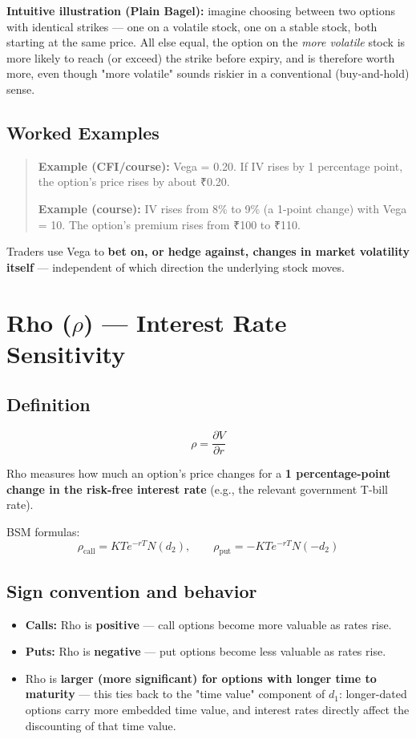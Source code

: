 \documentclass[12pt,openany]{book}
\theoremstyle{definition}
\theoremstyle{remark}
\begin{document}
\textbf{Intuitive illustration (Plain Bagel):} imagine choosing between two options with identical strikes — one on a volatile stock, one on a stable stock, both starting at the same price. All else equal, the option on the \emph{more volatile} stock is more likely to reach (or exceed) the strike before expiry, and is therefore worth more, even though "more volatile" sounds riskier in a conventional (buy-and-hold) sense.

\subsection{Worked Examples}

\begin{quote}
\textbf{Example (CFI/course):} Vega = 0.20. If IV rises by 1 percentage point, the option's price rises by about ₹0.20.

\textbf{Example (course):} IV rises from 8\% to 9\% (a 1-point change) with Vega = 10. The option's premium rises from ₹100 to ₹110.
\end{quote}

Traders use Vega to \textbf{bet on, or hedge against, changes in market volatility itself} — independent of which direction the underlying stock moves.


\section{Rho (\texorpdfstring{\(\rho\)}{rho}) — Interest Rate Sensitivity}

\subsection{Definition}

\[
\rho = \frac{\partial V}{\partial r}
\]

Rho measures how much an option's price changes for a \textbf{1 percentage-point change in the risk-free interest rate} (e.g., the relevant government T-bill rate).

BSM formulas:
\[
\rho_{\text{call}} = KTe^{-rT}N(d_2), \qquad \rho_{\text{put}} = -KTe^{-rT}N(-d_2)
\]

\subsection{Sign convention and behavior}

\begin{itemize}
\item \textbf{Calls:} Rho is \textbf{positive} — call options become more valuable as rates rise.
\item \textbf{Puts:} Rho is \textbf{negative} — put options become less valuable as rates rise.
\item Rho is \textbf{larger (more significant) for options with longer time to maturity} — this ties back to the "time value" component of \(d_1\): longer-dated options carry more embedded time value, and interest rates directly affect the discounting of that time value.
\end{itemize}
\end{document}
